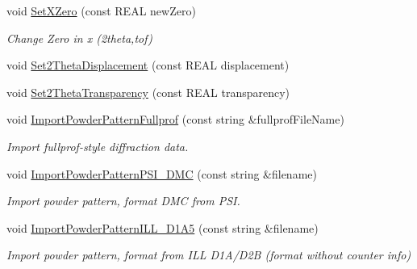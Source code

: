 \begin{DoxyCompactItemize}
\item 
\mbox{\label{class_obj_cryst_1_1_powder_pattern_a5f0a77781549a546e5e2b9dc76f14622}} 
void \mbox{\hyperlink{class_obj_cryst_1_1_powder_pattern_a5f0a77781549a546e5e2b9dc76f14622}{Set\+X\+Zero}} (const R\+E\+AL new\+Zero)
\begin{DoxyCompactList}\small\item\em Change Zero in x (2theta,tof) \end{DoxyCompactList}\item 
void \mbox{\hyperlink{class_obj_cryst_1_1_powder_pattern_aee018af94fbc876762ccd98b0c8cb982}{Set2\+Theta\+Displacement}} (const R\+E\+AL displacement)
\item 
void \mbox{\hyperlink{class_obj_cryst_1_1_powder_pattern_a7520df007f0e2058201c81f6bf6122ff}{Set2\+Theta\+Transparency}} (const R\+E\+AL transparency)
\item 
void \mbox{\hyperlink{class_obj_cryst_1_1_powder_pattern_a4499e38a96db3f3c0abdb6d30f3400e1}{Import\+Powder\+Pattern\+Fullprof}} (const string \&fullprof\+File\+Name)
\begin{DoxyCompactList}\small\item\em Import fullprof-\/style diffraction data. \end{DoxyCompactList}\item 
\mbox{\label{class_obj_cryst_1_1_powder_pattern_a1ccba50e0df8ec4fb53c262b72ef384f}} 
void \mbox{\hyperlink{class_obj_cryst_1_1_powder_pattern_a1ccba50e0df8ec4fb53c262b72ef384f}{Import\+Powder\+Pattern\+P\+S\+I\+\_\+\+D\+MC}} (const string \&filename)
\begin{DoxyCompactList}\small\item\em Import powder pattern, format D\+MC from P\+SI. \end{DoxyCompactList}\item 
\mbox{\label{class_obj_cryst_1_1_powder_pattern_a900f73bf552e7e6264638dd6ed6276a1}} 
void \mbox{\hyperlink{class_obj_cryst_1_1_powder_pattern_a900f73bf552e7e6264638dd6ed6276a1}{Import\+Powder\+Pattern\+I\+L\+L\+\_\+\+D1\+A5}} (const string \&filename)
\begin{DoxyCompactList}\small\item\em Import powder pattern, format from I\+LL D1\+A/\+D2B (format without counter info) \end{DoxyCompactList}\item 

\end{DoxyCompactItemize}
